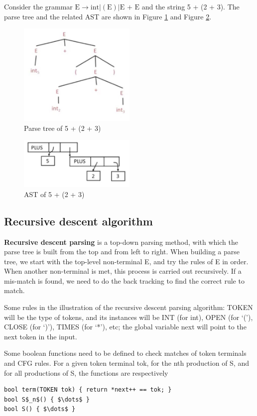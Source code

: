 Consider the grammar $\text{E} \rightarrow \text{int} | (\text{E}) | \text{E + E}$ and the string 5 + (2 + 3). The parse tree and the related AST are shown in Figure \ref{parsetree} and Figure \ref{ast}.
\begin{figure}
\centering
\includegraphics[width = 0.5\textwidth]{parsetree.jpg}
\caption{Parse tree of 5 + (2 + 3)}\label{parsetree}
\end{figure}
\begin{figure}
\centering
\includegraphics[width = 0.5\textwidth]{ast.jpg}
\caption{AST of 5 + (2 + 3)}\label{ast}
\end{figure}
\subsection{Recursive descent algorithm}
{\bf Recursive descent parsing} is a top-down parsing method, with which the parse tree is built from the top and from left to right. When building a parse tree, we start with the top-level non-terminal E, and try the rules of E in order. When another non-terminal is met, this process is carried out recursively. If a mis-match is found, we need to do the back tracking to find the correct rule to match.

Some rules in the illustration of the recursive descent parsing algorithm: TOKEN will be the type of tokens, and its instances will be INT (for int), OPEN (for `('), CLOSE (for `)'), TIMES (for `*'), etc; the global variable {\sf next} will point to the next token in the input.

Some boolean functions need to be defined to check matches of token terminals and CFG rules. For a given token terminal {\sf tok}, for the nth production of S, and for all productions of S, the functions are respectively 
\begin{lstlisting}[mathescape]
bool term(TOKEN tok) { return *next++ == tok; }
bool S$_n$() { $\dots$ }
bool S() { $\dots$ }
\end{lstlisting}

